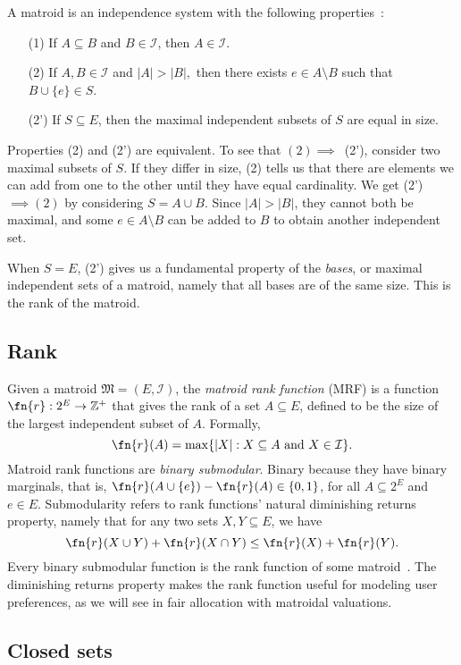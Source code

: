 A matroid is an independence system with the following properties~\cite{whitney-1935}:
\begin{enumerate}
  \item[(1)] If $A \subseteq B$ and $B \in \mathcal{I}$, then $A \in \mathcal{I}$.
  \item[(2)] If $A, B \in \mathcal{I}$ and $|A| > |B|,$ then there exists $e \in A \setminus B$ such that $B \cup \{e\} \in S$.
  \item[(2')] If $S \subseteq E$, then the maximal independent subsets of $S$ are equal in size.
\end{enumerate}
Properties (2) and (2') are equivalent. To see that $(2) \implies$~(2'), consider two maximal subsets of $S$. If they differ in size, (2) tells us that there are elements we can add from one to the other until they have equal cardinality. We get (2')~$\implies (2)$ by considering $S = A \cup B$. Since $|A|>|B|$, they cannot both be maximal, and some $e \in A \setminus B$ can be added to $B$ to obtain another independent set.

When $S=E$, (2') gives us a fundamental property of the \textit{bases}, or maximal independent sets of a matroid, namely that all bases are of the same size. This is the rank of the matroid.


\subsection*{Rank}
Given a matroid $\mathfrak{M} = (E, \mathcal{I})$, the \textit{matroid rank function} (MRF) is a function $\fn{r} : 2^E \to \mathbb{Z}^+$ that gives the rank of a set $ A \subseteq E$, defined to be the size of the largest independent subset of $A$. Formally, $$\fn{r}(A) = \max\{|X| : X \subseteq A \text{ and } X \in \mathcal{I}\}.$$ Matroid rank functions are \textit{binary submodular}. Binary because they have binary marginals, that is, $\fn{r}(A \cup \{ e \}) - \fn{r}(A) \in \{0,1\}$, for all $A \subseteq 2^E$ and $e \in E$. Submodularity refers to rank functions' natural diminishing returns property, namely that for any two sets $X, Y \subseteq E$, we have $$\fn{r}(X \cup Y) + \fn{r}(X \cap Y) \leq \fn{r}(X) + \fn{r}(Y).$$ Every binary submodular function is the rank function of some matroid~\cite{Welsh1976-wj}. The diminishing returns property makes the rank function useful for modeling user preferences, as we will see in fair allocation with matroidal valuations.

\subsection*{Closed sets}

